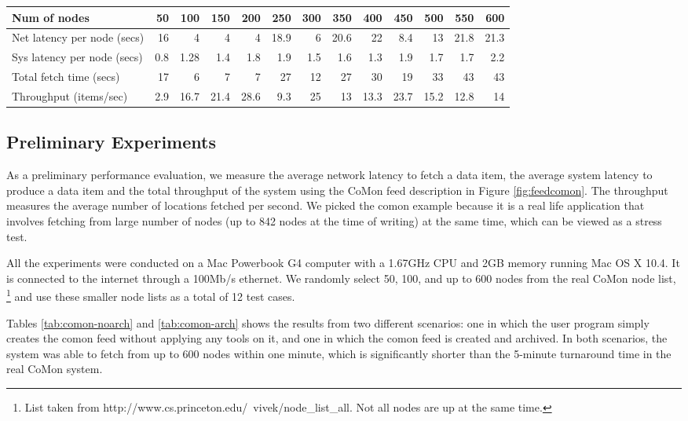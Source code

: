 \begin{table*}
\begin{center}
\begin{tabular}{|l|r|r|r|r|r|r|r|r|r|r|r|r|}\hline
Num of nodes&	50&	100&	150&	200&	250&	300&	350&	400&	450&	500&	550&	600 \\ \hline\hline
Net latency per node (secs)&	16&	4&	4&	4&	18.9&	6&	20.6&	22&	8.4&	13&	21.8&	21.3 \\ \hline
Sys latency per node (secs)&	0.8&	1.28&	1.4&	1.8&	1.9&	1.5&	1.6&	1.3&	1.9&	1.7&	1.7&	2.2 \\ \hline
Total fetch time (secs)&	17&	6&	7&	7&	27&	12&	27&	30&	19&	33&	43&	43 \\ \hline
Throughput (items/sec)&	2.9&	16.7&	21.4&	28.6&	9.3&	25&	13&	13.3&	23.7&	15.2&	12.8&	14 \\ \hline
\end{tabular}
\end{center}
\caption{Performance of CoMon with archiving}
\label{tab:comon-arch}
\end{table*}

\subsection{Preliminary Experiments} \label{sec:experiments}
As a preliminary performance evaluation, 
we measure the average network latency
to fetch a data item, the average system latency 
to produce a data item
and the total throughput of the system using the CoMon feed
description in Figure \ref{fig:feedcomon}. 
The throughput measures the average
number of locations fetched per second. We picked
the comon example because it is a real life
application that involves fetching from large number of 
nodes (up to 842 nodes at the time of writing)
at the same time, which can be viewed as a stress test. 

All the experiments were conducted on a Mac Powerbook G4 computer
with a 1.67GHz CPU and 2GB memory running Mac OS X 10.4. It is
connected to the internet through a 100Mb/s ethernet. 
We randomly select 50, 100, and up to 600 nodes from the 
real CoMon node list, 
\footnote{List taken from http://www.cs.princeton.edu/~vivek/node\_list\_all. 
Not all nodes are up at the same time.}
and use these smaller node lists as a total of 12 test cases. 

Tables \ref{tab:comon-noarch} and \ref{tab:comon-arch}
shows the results from two different scenarios:
one in which the user program simply creates the comon feed without applying
any tools on it, and one in which the comon feed is created
and archived. In both scenarios, the system was
able to fetch from up to 600 nodes within one minute, which is
significantly shorter than the 5-minute turnaround time in the real
CoMon system.

